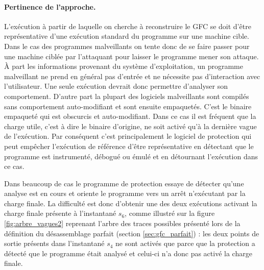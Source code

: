 \paragraph{Pertinence de l'approche.}
L'exécution à partir de laquelle on cherche à reconstruire le GFC se doit d'être représentative d'une exécution standard du programme sur une machine cible.
Dans le cas des programmes malveillants on tente donc de se faire passer pour une machine ciblée par l'attaquant pour laisser le programme mener son attaque. 
À part les informations provenant du système d'exploitation, un programme malveillant ne prend en général pas d'entrée et ne nécessite pas d'interaction avec l'utilisateur. Une seule exécution devrait donc permettre d'analyser son comportement.
D'autre part la plupart des logiciels malveillants sont compilés sans comportement auto-modifiant et sont ensuite empaquetés. C'est le binaire empaqueté qui est obscurcis et auto-modifiant.
Dans ce cas il est fréquent \cite{Calvet2013} que la charge utile, c'est à dire le binaire d'origine, ne soit activé qu'à la dernière vague de l'exécution.
Par conséquent c'est principalement le logiciel de protection qui peut empêcher l'exécution de référence d'être représentative en détectant que le programme est instrumenté, débogué ou émulé et en détournant l'exécution dans ce cas.

Dans beaucoup de cas le programme de protection essaye de détecter qu'une analyse est en cours et oriente le programme vers un arrêt n'exécutant par la charge finale.
La difficulté est donc d'obtenir une des deux exécutions activant la charge finale présente à l'instantané $s_6$, comme illustré sur la figure \ref{fig:arbre_vagues2} reprenant l'arbre des traces possibles présenté lors de la définition du désassemblage parfait (section \ref{sec:gfc_parfait}) : les deux points de sortie présents dans l'instantané $s_4$ ne sont activés que parce que la protection a détecté que le programme était analysé et celui-ci n'a donc pas activé la charge finale.


